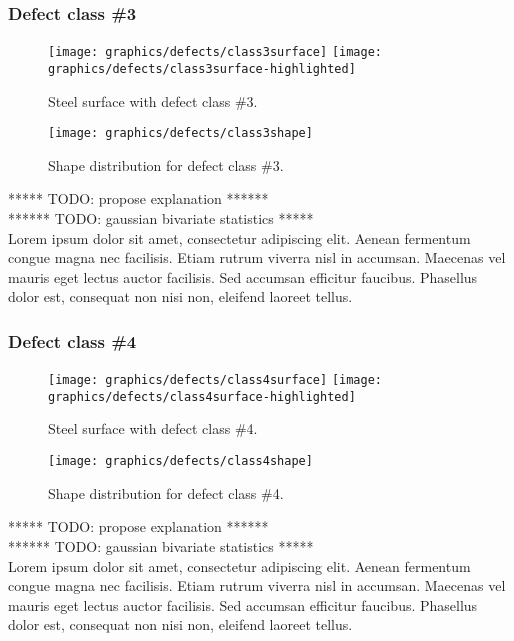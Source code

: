         \subsubsection{Defect class \#3}
            \begin{figure}
                \texttt{[image: graphics/defects/class3surface]}
                \texttt{[image: graphics/defects/class3surface-highlighted]}
                \caption{Steel surface with defect class \#3.}\label{fig:defects:surface-3}
            \end{figure}
            \begin{figure}
                \texttt{[image: graphics/defects/class3shape]}
                \caption{Shape distribution for defect class \#3.}\label{fig:defects:shape-3}
            \end{figure}
            \par{
                ***** TODO: propose explanation ******\\
                ****** TODO: gaussian bivariate statistics *****\\
                Lorem ipsum dolor sit amet, consectetur adipiscing elit. Aenean fermentum congue magna nec facilisis. Etiam rutrum viverra nisl in accumsan. Maecenas vel mauris eget lectus auctor facilisis. Sed accumsan efficitur faucibus. Phasellus dolor est, consequat non nisi non, eleifend laoreet tellus.
            }

        \subsubsection{Defect class \#4}
            \begin{figure}
                \texttt{[image: graphics/defects/class4surface]}
                \texttt{[image: graphics/defects/class4surface-highlighted]}
                \caption{Steel surface with defect class \#4.}\label{fig:defects:surface-4}
            \end{figure}
            \begin{figure}
                \texttt{[image: graphics/defects/class4shape]}
                \caption{Shape distribution for defect class \#4.}\label{fig:defects:shape-4}
            \end{figure}
            \par{
                ***** TODO: propose explanation ******\\
                ****** TODO: gaussian bivariate statistics *****\\
                Lorem ipsum dolor sit amet, consectetur adipiscing elit. Aenean fermentum congue magna nec facilisis. Etiam rutrum viverra nisl in accumsan. Maecenas vel mauris eget lectus auctor facilisis. Sed accumsan efficitur faucibus. Phasellus dolor est, consequat non nisi non, eleifend laoreet tellus.
            }
